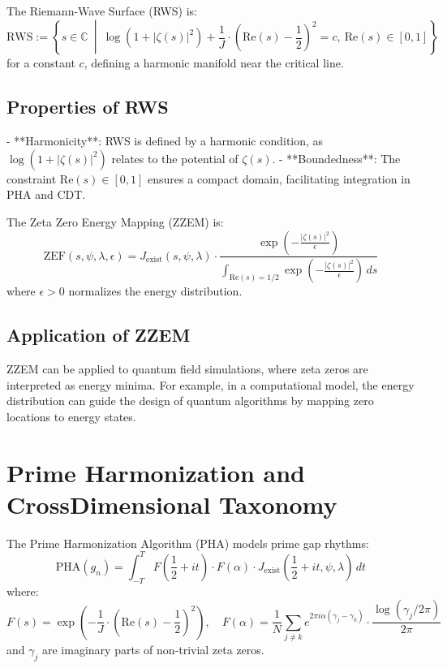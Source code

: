 \documentclass[12pt]{article}
\begin{document}
{{{\begin{onehalfspace}
\begin{definition}
The Riemann-Wave Surface (RWS) is:
\[
\text{RWS} := \left\{ s \in \mathbb{C} \ \middle| \ \log\left(1 + |\zeta(s)|^2\right) + \frac{1}{J} \cdot \left(\text{Re}(s) - \frac{1}{2}\right)^2 = c, \ \text{Re}(s) \in [0,1] \right\}
\]
for a constant \( c \), defining a harmonic manifold near the critical line.
\end{definition}

\subsection*{Properties of RWS}
- **Harmonicity**: RWS is defined by a harmonic condition, as \( \log\left(1 + |\zeta(s)|^2\right) \) relates to the potential of \(\zeta(s)\).
- **Boundedness**: The constraint \( \text{Re}(s) \in [0,1] \) ensures a compact domain, facilitating integration in PHA and CDT.

\begin{definition}
The Zeta Zero Energy Mapping (ZZEM) is:
\[
\text{ZEF}(s, \psi, \lambda, \epsilon) = J_{\text{exist}}(s, \psi, \lambda) \cdot \frac{\exp\left(-\frac{|\zeta(s)|^2}{\epsilon}\right)}{\int_{\text{Re}(s)=1/2} \exp\left(-\frac{|\zeta(s)|^2}{\epsilon}\right) \, ds}
\]
where \( \epsilon > 0 \) normalizes the energy distribution.
\end{definition}

\subsection*{Application of ZZEM}
ZZEM can be applied to quantum field simulations, where zeta zeros are interpreted as energy minima. For example, in a computational model, the energy distribution can guide the design of quantum algorithms by mapping zero locations to energy states.

\section{Prime Harmonization and CrossDimensional Taxonomy}

\begin{definition}
The Prime Harmonization Algorithm (PHA) models prime gap rhythms:
\[
\text{PHA}(g_n) = \int_{-T}^{T} F\left(\frac{1}{2} + it\right) \cdot F(\alpha) \cdot J_{\text{exist}}\left(\frac{1}{2} + it, \psi, \lambda\right) \, dt
\]
where:
\[
F(s) = \exp\left(-\frac{1}{J} \cdot \left(\text{Re}(s) - \frac{1}{2}\right)^2\right), \quad F(\alpha) = \frac{1}{N} \sum_{j \neq k} e^{2\pi i \alpha (\gamma_j - \gamma_k)} \cdot \frac{\log(\gamma_j / 2\pi)}{2\pi}
\]
and \( \gamma_j \) are imaginary parts of non-trivial zeta zeros.
\end{definition}


\end{onehalfspace}}}}
\end{document}
